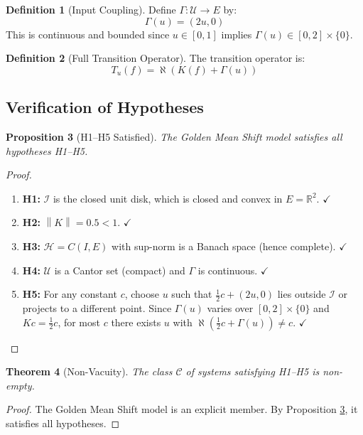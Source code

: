 \documentclass[11pt,a4paper]{article}
\theoremstyle{plain}
\newtheorem{theorem}{Theorem}[section]
\newtheorem{proposition}[theorem]{Proposition}
\theoremstyle{definition}
\newtheorem{definition}[theorem]{Definition}
\newcommand{\Hilb}{\mathcal{H}}
\newcommand{\I}{\mathcal{I}}
\newcommand{\U}{\mathcal{U}}
\newcommand{\norm}[1]{\left\lVert #1 \right\rVert}
\begin{document}
\begin{definition}[Input Coupling]
Define $\Gamma: \U \to E$ by:
\[
\Gamma(u) = (2u, 0)
\]
This is continuous and bounded since $u \in [0, 1]$ implies $\Gamma(u) \in [0, 2] \times \{0\}$.
\end{definition}

\begin{definition}[Full Transition Operator]
The transition operator is:
\[
T_u(f) = \aleph(K(f) + \Gamma(u))
\]
\end{definition}

\subsection{Verification of Hypotheses}

\begin{proposition}[H1--H5 Satisfied]\label{prop:Q3verify}
The Golden Mean Shift model satisfies all hypotheses H1--H5.
\end{proposition}

\begin{proof}
\begin{enumerate}
    \item \textbf{H1:} $\I$ is the closed unit disk, which is closed and convex in $E = \mathbb{R}^2$. $\checkmark$
    \item \textbf{H2:} $\norm{K} = 0.5 < 1$. $\checkmark$
    \item \textbf{H3:} $\Hilb = C(I, E)$ with sup-norm is a Banach space (hence complete). $\checkmark$
    \item \textbf{H4:} $\U$ is a Cantor set (compact) and $\Gamma$ is continuous. $\checkmark$
    \item \textbf{H5:} For any constant $c$, choose $u$ such that $\frac{1}{2}c + (2u, 0)$ lies outside $\I$ or projects to a different point. Since $\Gamma(u)$ varies over $[0, 2] \times \{0\}$ and $Kc = \frac{1}{2}c$, for most $c$ there exists $u$ with $\aleph(\frac{1}{2}c + \Gamma(u)) \neq c$. $\checkmark$
\end{enumerate}
\end{proof}

\begin{theorem}[Non-Vacuity]
The class $\mathscr{C}$ of systems satisfying H1--H5 is non-empty.
\end{theorem}

\begin{proof}
The Golden Mean Shift model is an explicit member. By Proposition \ref{prop:Q3verify}, it satisfies all hypotheses.
\end{proof}
\end{document}

